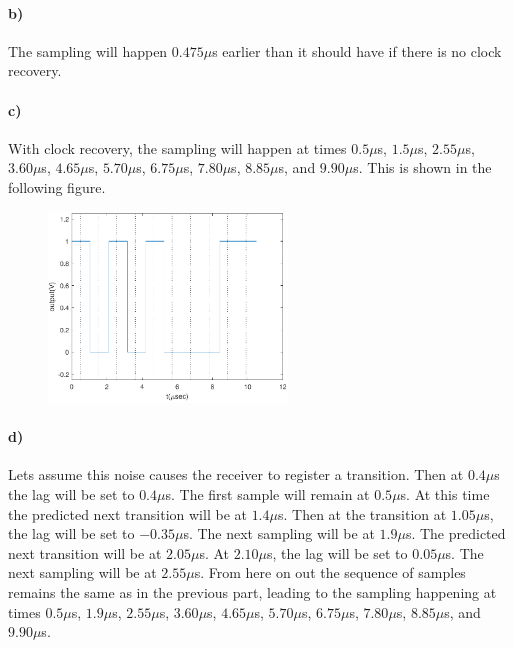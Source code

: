 \documentclass[12pt]{article}
\begin{document}
\paragraph{b)}

The sampling will happen \(0.475\mu\)s earlier than it should have if there is no clock recovery.

\paragraph{c)}

With clock recovery, the sampling will happen at times \(0.5\mu\)s, \(1.5\mu\)s, \(2.55\mu\)s, \(3.60\mu\)s, \(4.65\mu\)s, \(5.70\mu\)s, \(6.75\mu\)s,
\(7.80\mu\)s, \(8.85\mu\)s, and \(9.90\mu\)s. This is shown in the following figure.
\begin{figure}[H]
    \begin{center}
        \includegraphics[width=2.5in]{problem3c.pdf}
    \end{center}
\end{figure}

\paragraph{d)}

Lets assume this noise causes the receiver to register a transition. Then at \(0.4\mu\)s the lag will be set to \(0.4\mu\)s. The first
sample will remain at \(0.5\mu\)s. At this time the predicted next transition will be at \(1.4\mu\)s. Then at the transition at \(1.05\mu\)s, the lag will be set to
\(-0.35\mu\)s. The next sampling will be at \(1.9\mu\)s. The predicted next transition will be at \(2.05\mu\)s. At \(2.10\mu\)s, the lag will be set to \(0.05\mu\)s.
The next sampling will be at \(2.55\mu\)s. From here on out the sequence of samples remains the same as in the previous part, leading to the sampling
happening at times \(0.5\mu\)s, \(1.9\mu\)s, \(2.55\mu\)s, \(3.60\mu\)s, \(4.65\mu\)s, \(5.70\mu\)s, \(6.75\mu\)s, \(7.80\mu\)s, \(8.85\mu\)s, and \(9.90\mu\)s.
\end{document}
